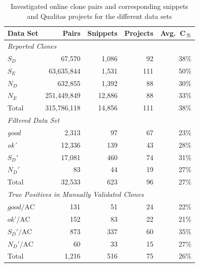 \documentclass[sigconf,review, anonymous]{acmart}
\begin{document}
\begin{table}
\caption{Investigated online clone pairs and corresponding snippets
  and Qualitas projects for the different data sets}
\label{tab:snippets}
\centering
\begin{tabular}{l|rrrr}
  \hline 
  Data Set & Pairs & Snippets & Projects & Avg.~C$_{\textrm{\textit{\%}}}$ \\
  \hline 
  \multicolumn{5}{l}{\textit{Reported Clones}} \\
  \hline
  $S_D$ & 67,570 & 1,086 & 92 & 38\% \\
  $S_E$ & 63,635,844 & 1,531 & 111 & 50\% \\
  $N_D$ & 632,855& 1,392 & 88 & 30\% \\
  $N_E$ & 251,449,849& 12,886 & 88 & 33\% \\
  \hline
  Total & 315,786,118 & 14,856 & 111 & 38\% \\
  \hline
  \multicolumn{5}{l}{\textit{Filtered Data Set}} \\
  \hline
  \textit{good} & 2,313 & 97 & 67 & 23\% \\
  \textit{ok'} & 12,336 & 139 & 43 & 28\% \\
  $S_D'$ & 17,081 & 460 & 74 & 31\% \\
  $N_D'$ & 83 & 44 & 19 & 27\% \\
  \hline
  Total & 32,533 & 623 & 96 & 27\%\\
  \hline 
  \multicolumn{5}{l}{\textit{True Positives in Manually Validated Clones}} \\
  \hline 
  $\textit{good}/\textrm{AC}$ & 131 & 51 & 24 & 22\% \\
  $\textit{ok'}/\textrm{AC}$ & 152 & 83 & 22 & 21\% \\
  $S_D'/\textrm{AC}$ & 873 & 337 & 60 & 35\% \\
  $N_D'/\textrm{AC}$ & 60 & 33 & 15 & 27\% \\
  \hline
  Total & 1,216 & 516 & 75 & 26\% \\
  \hline
\end{tabular}
\end{table}
\end{document}
